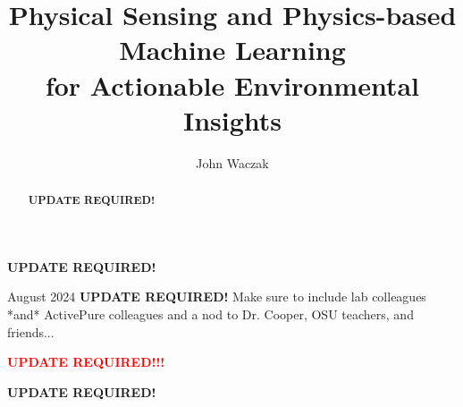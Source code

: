 \documentclass[doublespacing]{utdthesis}
\author{John Waczak}
\title{Physical Sensing and Physics-based Machine Learning \\ for Actionable Environmental Insights}
\begin{document}
\frontmatter

\signaturepage


\begin{dedication} %
  \color{red}
  \textbf{UPDATE REQUIRED!}
\end{dedication}


\maketitle

\begin{acks}{August 2024} %
  \color{red}
  \textbf{UPDATE REQUIRED!} Make sure to include lab colleagues *and* ActivePure colleagues and a nod to Dr. Cooper, OSU teachers, and friends...
\end{acks}

\begin{abstract}
  \color{red}
  \textbf{UPDATE REQUIRED!}
\end{abstract}

\tableofcontents
\listoffigures %
\listoftables %

\mainmatter


% 
% 









\appendix %








\begin{thesisbib}  %
  
\end{thesisbib}  %

\begin{biosketch}
  \textcolor{red}{\textbf{UPDATE REQUIRED!!!}}
\end{biosketch}


\begin{vita}  %
  \textbf{UPDATE REQUIRED!}
\end{vita}  %
\end{document}
